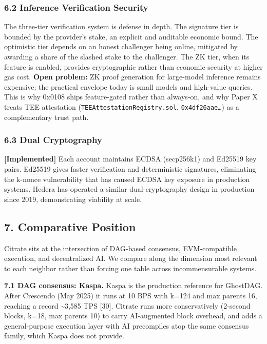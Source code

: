 \subsubsection{6.2 Inference Verification
Security}\label{inference-verification-security}

The three-tier verification system is defense in depth. The signature
tier is bounded by the provider's stake, an explicit and auditable
economic bound. The optimistic tier depends on an honest challenger
being online, mitigated by awarding a share of the slashed stake to the
challenger. The ZK tier, when its feature is enabled, provides
cryptographic rather than economic security at higher gas cost.
\textbf{Open problem:} ZK proof generation for large-model inference
remains expensive; the practical envelope today is small models and
high-value queries. This is why 0x0108 ships feature-gated rather than
always-on, and why Paper X treats TEE attestation
(\texttt{TEEAttestationRegistry.sol}, \texttt{0x4df26aae…}) as a
complementary trust path.

\subsubsection{6.3 Dual Cryptography}\label{dual-cryptography}

\textbf{{[}Implemented{]}} Each account maintains ECDSA (secp256k1) and
Ed25519 key pairs. Ed25519 gives faster verification and deterministic
signatures, eliminating the k-nonce vulnerability that has caused ECDSA
key exposure in production systems. Hedera has operated a similar
dual-cryptography design in production since 2019, demonstrating
viability at scale.

\subsection{7. Comparative Position}\label{comparative-position}

Citrate sits at the intersection of DAG-based consensus, EVM-compatible
execution, and decentralized AI. We compare along the dimension most
relevant to each neighbor rather than forcing one table across
incommensurable systems.

\textbf{7.1 DAG consensus: Kaspa.} Kaspa is the production reference for
GhostDAG. After Crescendo (May 2025) it runs at 10 BPS with k=124 and
max parents 16, reaching a record \textasciitilde3,585 TPS {[}30{]}.
Citrate runs more conservatively (2-second blocks, k=18, max parents 10)
to carry AI-augmented block overhead, and adds a general-purpose
execution layer with AI precompiles atop the same consensus family,
which Kaspa does not provide.

